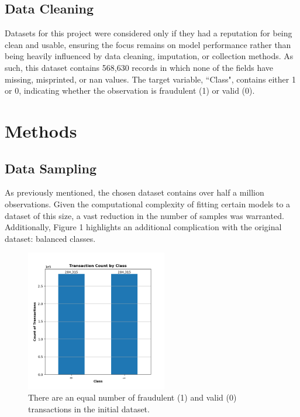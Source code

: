 \documentclass[11pt, oneside]{article}   	%
\begin{document}
\subsection{Data Cleaning}

Datasets for this project were considered only if they had a reputation for being clean and usable, ensuring the focus remains on model performance rather than being heavily influenced by data cleaning, imputation, or collection methods. As such, this dataset contains 568,630 records in which none of the fields have missing, misprinted, or nan values. The target variable, ``Class", contains either 1 or 0, indicating whether the observation is fraudulent (1) or valid (0). \\
	



\section{Methods}




\subsection{Data Sampling}

As previously mentioned, the chosen dataset contains over half a million observations. Given the computational complexity of fitting certain models to a dataset of this size, a vast reduction in the number of samples was warranted. Additionally, Figure 1 highlights an additional complication with the original dataset: balanced classes. 

\begin{figure}[h!]
	\centering
	\includegraphics[width=0.55\textwidth]{figures/fig_1.png}	
	\captionsetup{font=small} 
	\caption{There are an equal number of fraudulent (1) and valid (0) transactions in the initial dataset.}
	\label{fig1}
\end{figure}
\end{document}

